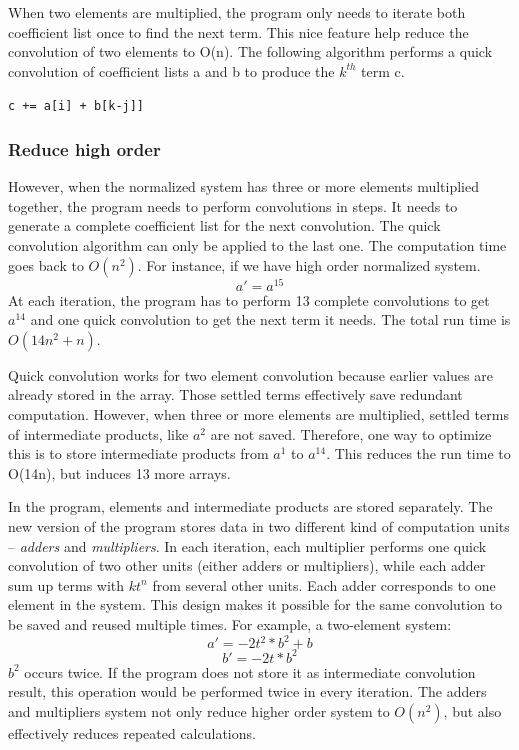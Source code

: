 \documentclass[12pt]{article}
\begin{document}
When two elements are multiplied, the program only needs to iterate both coefficient list once to find the next term. This nice feature help reduce the convolution of two elements to O(n). The following algorithm performs a quick convolution of coefficient lists a and b to produce the $k^{th}$ term c.

\begin{algorithmic}
   \State \texttt{c += a[i] + b[k-j]]}
\EndFor
\end{algorithmic}


\subsubsection{Reduce high order}
However, when the normalized system has three or more elements multiplied together, the program needs to perform convolutions in steps. It needs to generate a complete coefficient list for the next convolution. The quick convolution algorithm can only be applied to the last one. The computation time goes back to $O(n^2)$.
For instance, if we have high order normalized system.
\begin{equation}
a' = a^{15}
\end{equation}
At each iteration, the program has to perform 13 complete convolutions to get $a^{14}$ and one quick convolution to get the next term it needs. The total run time is $O(14n^{2}+n)$.

Quick convolution works for two element convolution because earlier values are already stored in the array. Those settled terms effectively save redundant computation. However, when three or more elements are multiplied, settled terms of intermediate products, like $a^{2}$ are not saved. Therefore, one way to optimize this is to store intermediate products from $a^{1}$ to $a^{14}$. This reduces the run time to O(14n), but induces 13 more arrays.

In the program, elements and intermediate products are stored separately. The new version of the program stores data in two different kind of computation units -- {\it adders} and {\it multipliers}. In each iteration, each multiplier performs one quick convolution of two other units (either adders or multipliers), while each adder sum up terms with $kt^{n}$ from several other units. Each adder corresponds to one element in the system. This design makes it possible for the same convolution to be saved and reused multiple times. For example, a two-element system: 
\begin{equation}
a' = - 2t^{2}*b^{2} + b
\end{equation}
\begin{equation}
b' = - 2t*b^{2}
\end{equation}
$b^{2}$ occurs twice. If the program does not store it as intermediate convolution result, this operation would be performed twice in every iteration. The adders and multipliers system not only reduce higher order system to $O(n^{2})$, but also effectively reduces repeated calculations.
\end{document}
